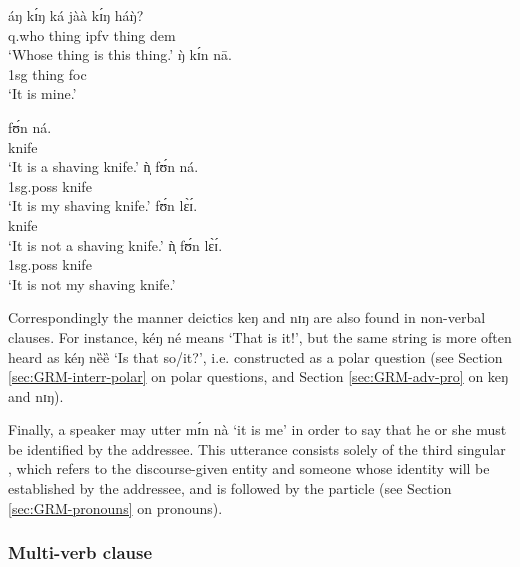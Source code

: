 \ea\label{ex:GRM-noverb-mine}
 \ea\label{ex:GRM-noverb-mine-1}
\gll áŋ kɪ́ŋ ká jàà kɪ́ŋ háŋ̀?\\
{\sc q.}who thing {\sc ipfv} {\ident} thing {\sc dem}\\
\glt `Whose thing is this thing.'
 \ex\label{ex:GRM-noverb-mine-2}
 \gll ŋ̀ kɪ́n nā.\\
{\sc 1sg} thing {\sc foc}\\
\glt `It is mine.'
\z 
 \z


\begin{multicols}{2}
\ea\label{ex:GRM-noverb}
 \ea\label{ex:GRM-noverb-aff-1}
\gll fʊ́n ná.\\
knife {\foc}\\
\glt `It is a shaving knife.'
 \ex\label{ex:GRM-noverb-aff-poss}
\gll ǹ̩ fʊ́n ná.\\
{\sc 1sg.poss} knife {\foc}\\
 \glt `It is my shaving knife.'
 \ex\label{ex:GRM-noverb-neg-1}
\gll fʊ́n lɛ̀ɪ́.\\
knife {\neg}\\
 \glt `It is not a shaving knife.'
 \ex\label{ex:GRM-noverb-neg-poss}
\gll ǹ̩  fʊ́n lɛ̀ɪ́.\\
{\sc 1sg.poss} knife {\neg}\\
 \glt `It is not my shaving knife.'

\z 
 \z
\end{multicols}

Correspondingly the manner deictics {\sls keŋ} and {\sls  nɪŋ} are also found in non-verbal clauses. 
For instance, {\sls kéŋ né} means `That is it!', but the same string is more often heard as {\sls 
kéŋ nȅȅ} `Is that so/it?',  i.e. constructed  as a polar question (see Section 
\ref{sec:GRM-interr-polar} on polar questions, and Section \ref{sec:GRM-adv-pro}  on  {\sls keŋ} 
and 
{\sls  nɪŋ}).

Finally, a speaker may utter {\sls mɪ́n nà} `it is me' in order to say that he or 
she must be identified by the addressee. This utterance consists solely of the third singular 
, which refers to the discourse-given entity and someone whose identity will be established by the addressee, and is followed by the  particle (see Section \ref{sec:GRM-pronouns} on pronouns).


\subsubsection{Multi-verb clause}
\label{sec:GRM-multi-verb-clause}

